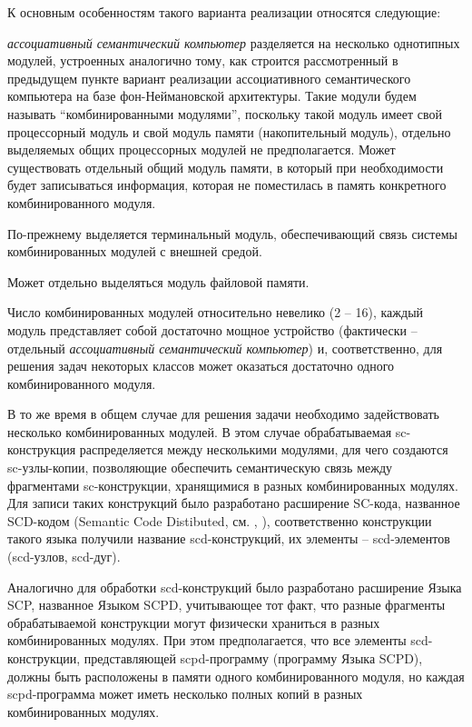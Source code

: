 К основным особенностям такого варианта реализации относятся следующие:
\begin{textitemize}
	\item \textit{ассоциативный семантический компьютер} разделяется на несколько однотипных модулей, устроенных аналогично тому, как строится рассмотренный в предыдущем пункте вариант реализации ассоциативного семантического компьютера на базе фон-Неймановской архитектуры. Такие модули будем называть ``комбинированными модулями'', поскольку такой модуль имеет свой процессорный модуль и свой модуль памяти (накопительный модуль), отдельно выделяемых общих процессорных модулей не предполагается. Может существовать отдельный общий модуль памяти, в который при необходимости будет записываться информация, которая не поместилась в память конкретного комбинированного модуля.
	\item По-прежнему выделяется терминальный модуль, обеспечивающий связь системы комбинированных модулей с внешней средой.
	\item Может отдельно выделяться модуль файловой памяти.
	\item Число комбинированных модулей относительно невелико (2 -- 16), каждый модуль представляет собой достаточно мощное устройство (фактически -- отдельный \textit{ассоциативный семантический компьютер}) и, соответственно, для решения задач некоторых классов может оказаться достаточно одного комбинированного модуля.
	\item В то же время в общем случае для решения задачи необходимо задействовать несколько комбинированных модулей. В этом случае обрабатываемая sc-конструкция распределяется между несколькими модулями, для чего создаются sc-узлы-копии, позволяющие обеспечить семантическую связь между фрагментами sc-конструкции, хранящимися в разных комбинированных модулях. Для записи таких конструкций было разработано расширение SC-кода, названное SCD-кодом (Semantic Code Distibuted, см. , ), соответственно конструкции такого языка получили название scd-конструкций, их элементы -- scd-элементов (scd-узлов, scd-дуг).
	\item Аналогично для обработки scd-конструкций было разработано расширение Языка SCP, названное Языком SCPD, учитывающее тот факт, что разные фрагменты обрабатываемой конструкции могут физически храниться в разных комбинированных модулях. При этом предполагается, что все элементы scd-конструкции, представляющей scpd-программу (программу Языка SCPD), должны быть расположены в памяти одного комбинированного модуля, но каждая scpd-программа может иметь несколько полных копий в разных комбинированных модулях.

\end{textitemize}
